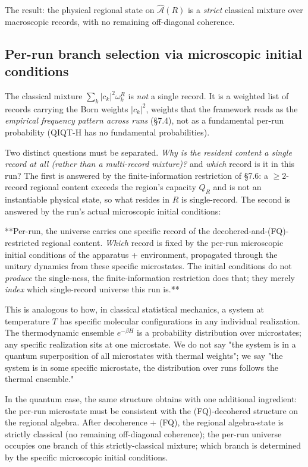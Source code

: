 \documentclass[11pt,a4paper]{article}
\begin{document}
The result: the physical regional state on $\hat{\mathcal{A}}(R)$ is a \emph{strict} classical mixture over macroscopic records, with no remaining off-diagonal coherence.

\subsection{Per-run branch selection via microscopic initial conditions}

The classical mixture $\sum_k |c_k|^2 \omega_k^R$ is \emph{not} a single record. It is a weighted list of records carrying the Born weights $|c_k|^2$, weights that the framework reads as the \emph{empirical frequency pattern across runs} (§7.4), not as a fundamental per-run probability (QIQT-H has no fundamental probabilities).

Two distinct questions must be separated. \emph{Why is the resident content a single record at all (rather than a multi-record mixture)?} and \emph{which} record is it in this run? The first is answered by the finite-information restriction of §7.6: a $\ge 2$-record regional content exceeds the region's capacity $Q_R$ and is not an instantiable physical state, so what resides in $R$ is single-record. The second is answered by the run's actual microscopic initial conditions:

**Per-run, the universe carries one specific record of the decohered-and-(FQ)-restricted regional content. \emph{Which} record is fixed by the per-run microscopic initial conditions of the apparatus + environment, propagated through the unitary dynamics from these specific microstates. The initial conditions do not \emph{produce} the single-ness, the finite-information restriction does that; they merely \emph{index} which single-record universe this run is.**

This is analogous to how, in classical statistical mechanics, a system at temperature $T$ has specific molecular configurations in any individual realization. The thermodynamic ensemble $e^{-\beta H}$ is a probability distribution over microstates; any specific realization sits at one microstate. We do not say "the system is in a quantum superposition of all microstates with thermal weights"; we say "the system is in some specific microstate, the distribution over runs follows the thermal ensemble."

In the quantum case, the same structure obtains with one additional ingredient: the per-run microstate must be consistent with the (FQ)-decohered structure on the regional algebra. After decoherence + (FQ), the regional algebra-state is strictly classical (no remaining off-diagonal coherence); the per-run universe occupies one branch of this strictly-classical mixture; which branch is determined by the specific microscopic initial conditions.
\end{document}
